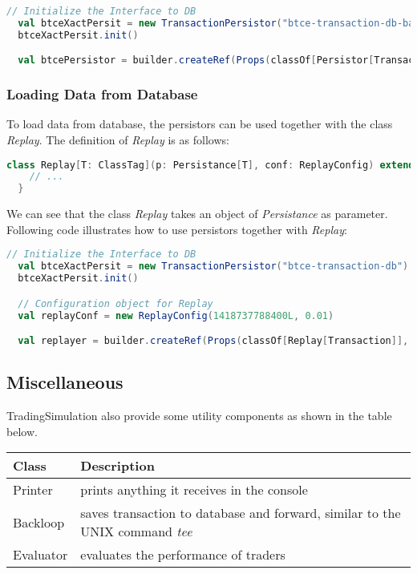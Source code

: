 \begin{lstlisting}[language=Scala]
  // Initialize the Interface to DB
  val btceXactPersit = new TransactionPersistor("btce-transaction-db-batch")
  btceXactPersit.init()

  val btcePersistor = builder.createRef(Props(classOf[Persistor[Transaction]], btceXactPersit, implicitly[ClassTag[Transaction]]), "btcePersistor")
\end{lstlisting}

\subsubsection{Loading Data from Database}

To load data from database, the persistors can be used together with the class \emph{Replay}. The definition of \emph{Replay} is as follows:

\begin{lstlisting}[language=Scala]
  class Replay[T: ClassTag](p: Persistance[T], conf: ReplayConfig) extends Component {
    // ...
  }
\end{lstlisting}

We can see that the class \emph{Replay} takes an object of \emph{Persistance} as parameter. Following code illustrates how to use persistors together with \emph{Replay}:

\begin{lstlisting}[language=Scala]
  // Initialize the Interface to DB
  val btceXactPersit = new TransactionPersistor("btce-transaction-db")
  btceXactPersit.init()

  // Configuration object for Replay
  val replayConf = new ReplayConfig(1418737788400L, 0.01)

  val replayer = builder.createRef(Props(classOf[Replay[Transaction]], btceXactPersit, replayConf, implicitly[ClassTag[Transaction]]), "replayer")
\end{lstlisting}

\subsection{Miscellaneous}

TradingSimulation also provide some utility components as shown in the table below.\\

\noindent
\begin{tabularx}{\textwidth}{|l|X|}
  \hline
  Class & Description  \\
  \hline
  Printer & prints anything it receives in the console \\
  \hline
  Backloop  & saves transaction to database and forward, similar to the UNIX command \emph{tee}  \\
  \hline
  Evaluator & evaluates the performance of traders\\
  \hline
\end{tabularx}\\[0.3cm]
